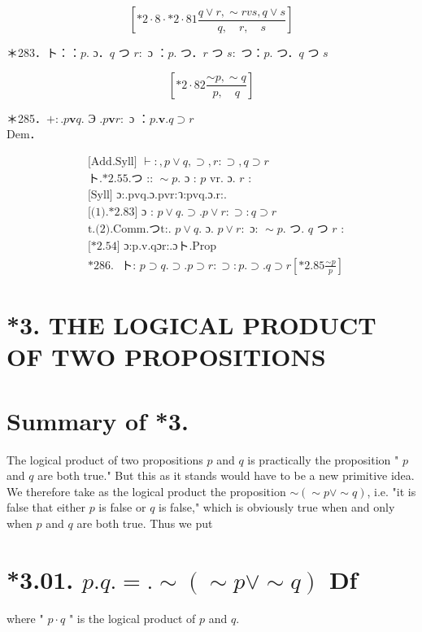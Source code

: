 \documentclass[10pt]{article}
\begin{document}
$$
\left[* 2 \cdot 8 \cdot * 2 \cdot 81 \frac{q \vee r, \sim r v s, q \vee s}{q, \quad r, \quad s}\right]
$$

＊283．ト：：$p$. ɔ．$q$ つ $r:$ ɔ ：$p$. つ．$r$ つ $s:$ つ：$p$. つ．$q$ つ $s$

$$
\left[* 2 \cdot 82 \frac{\sim p, \sim q}{p, \quad q}\right]
$$

＊285．$+: . p \mathbf{v} q$. Э $. p \mathbf{v} r:$ ɔ ：$p . \mathbf{v} . q \supset r$\\
Dem．


\begin{align*}
& \text { [Add.Syll] } \vdash:, p \vee q, \supset, r: \supset, q \supset r  \tag{1}\\
& \text { ト.*2.55.つ :: } \sim p . \text { ɔ : } p \text { vr. ɔ. } r \text { : } \\
& \text { [Syll] ɔ:.pvq.ɔ.pvr:ว:pvq.ɔ.r:. } \\
& \text { [(1).*2.83] ɔ : } p \vee q . \supset . p \vee r: \supset: q \supset r  \tag{2}\\
& \text { t.(2).Comm.つt:. } p \vee q . \text { ɔ. } p \vee r: \text { ɔ: } \sim p . \text { つ. } q \text { つ } r \text { : } \\
& \text { [*2.54] ɔ:p.v.qɔr:.ɔト.Prop } \\
& \text { *286. } \text { ト: } p \supset q . \supset . p \supset r: \supset: p . \supset . q \supset r\left[* 2.85 \frac{\sim p}{p}\right]
\end{align*}


\section*{*3. THE LOGICAL PRODUCT OF TWO PROPOSITIONS}
\section*{Summary of *3.}
The logical product of two propositions $p$ and $q$ is practically the proposition " $p$ and $q$ are both true." But this as it stands would have to be a new primitive idea. We therefore take as the logical product the proposition $\sim(\sim p \vee \sim q)$, i.e. "it is false that either $p$ is false or $q$ is false," which is obviously true when and only when $p$ and $q$ are both true. Thus we put

\section*{*3.01. $p . q .=. \sim(\sim p \vee \sim q)$ Df}
where " $p \cdot q$ " is the logical product of $p$ and $q$.
\end{document}
